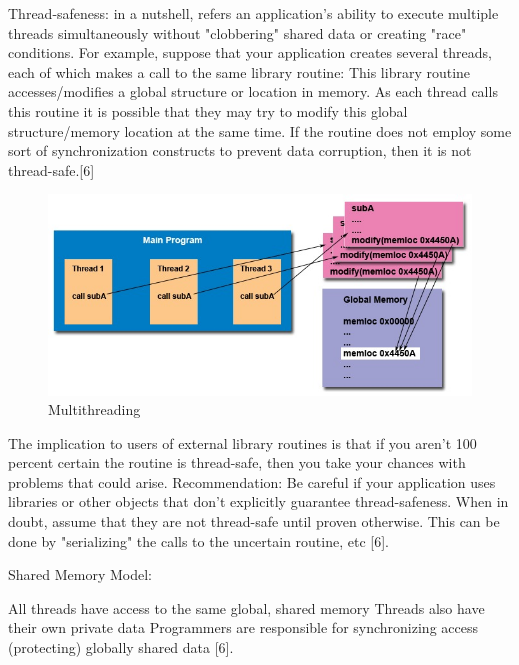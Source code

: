 Thread-safeness: in a nutshell, refers an application's ability to execute multiple threads simultaneously without "clobbering" shared data or creating "race" conditions.
For example, suppose that your application creates several threads, each of which makes a call to the same library routine:
This library routine accesses/modifies a global structure or location in memory.
As each thread calls this routine it is possible that they may try to modify this global structure/memory location at the same time.
If the routine does not employ some sort of synchronization constructs to prevent data corruption, then it is not thread-safe.[6]
\\
\begin{figure}[H]
\centering
\includegraphics[scale=0.5]{multithreading.jpg}
\caption{Multithreading}
\label{<<Label>>}
\end{figure}
The implication to users of external library routines is that if you aren't 100 percent certain the routine is thread-safe, then you take your chances with problems that could arise.
Recommendation: Be careful if your application uses libraries or other objects that don't explicitly guarantee thread-safeness. When in doubt, assume that they are not thread-safe until proven otherwise. This can be done by "serializing" the calls to the uncertain routine, etc [6].

Shared Memory Model:

All threads have access to the same global, shared memory
Threads also have their own private data
Programmers are responsible for synchronizing access (protecting) globally shared data [6].

